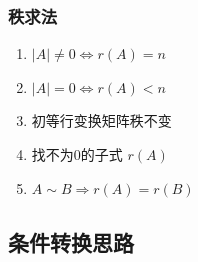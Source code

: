 \documentclass[./linear_algebra.tex]{subfiles}
\begin{document}
    \subsubsection{秩求法}

    \begin{enumerate}
        \item $|A| \neq 0 \Leftrightarrow r(A) = n$
        \item $|A| = 0 \Leftrightarrow r(A) < n$
        \item 初等行变换矩阵秩不变
        \item 找不为$0$的子式 \;\le\; $r(A)$
        \item $A \sim B \Rightarrow r(A) = r(B)$
    \end{enumerate}

    \subsection{条件转换思路}
\end{document}
